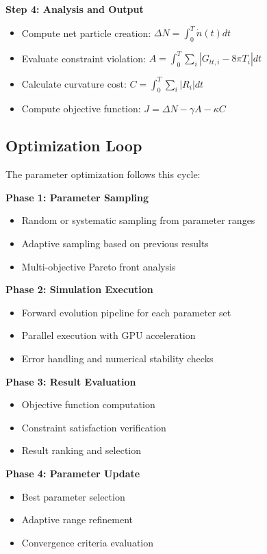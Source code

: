 \documentclass[11pt]{article}
\begin{document}
\textbf{Step 4: Analysis and Output}
\begin{itemize}
\item Compute net particle creation: $\Delta N = \int_0^T \dot{n}(t) dt$
\item Evaluate constraint violation: $A = \int_0^T \sum_i |G_{tt,i} - 8\pi T_i| dt$
\item Calculate curvature cost: $C = \int_0^T \sum_i |R_i| dt$
\item Compute objective function: $J = \Delta N - \gamma A - \kappa C$
\end{itemize}

\subsection{Optimization Loop}

The parameter optimization follows this cycle:

\textbf{Phase 1: Parameter Sampling}
\begin{itemize}
\item Random or systematic sampling from parameter ranges
\item Adaptive sampling based on previous results
\item Multi-objective Pareto front analysis
\end{itemize}

\textbf{Phase 2: Simulation Execution}
\begin{itemize}
\item Forward evolution pipeline for each parameter set
\item Parallel execution with GPU acceleration
\item Error handling and numerical stability checks
\end{itemize}

\textbf{Phase 3: Result Evaluation}
\begin{itemize}
\item Objective function computation
\item Constraint satisfaction verification
\item Result ranking and selection
\end{itemize}

\textbf{Phase 4: Parameter Update}
\begin{itemize}
\item Best parameter selection
\item Adaptive range refinement
\item Convergence criteria evaluation
\end{itemize}
\end{document}
